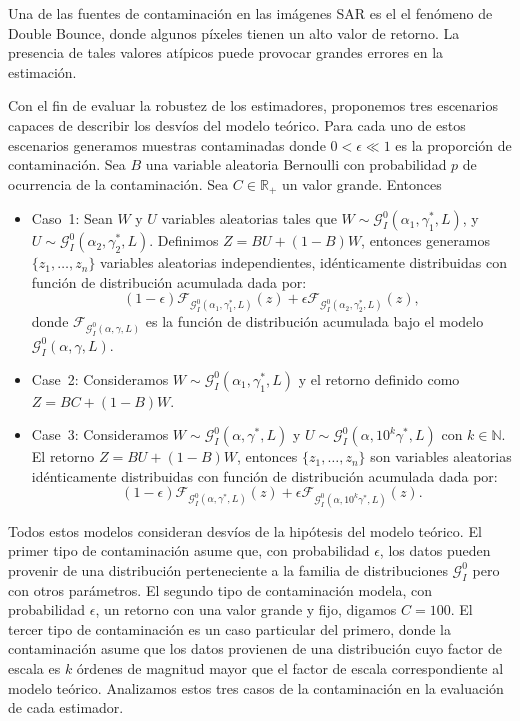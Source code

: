 Una de las fuentes de contaminación en las imágenes SAR es el el fenómeno de Double Bounce, donde algunos píxeles tienen un alto valor de retorno. La presencia de tales valores atípicos puede provocar grandes errores en la estimación.

Con el fin de evaluar la robustez de los estimadores, proponemos tres escenarios capaces de describir los desvíos del modelo teórico. Para cada uno de estos escenarios generamos muestras contaminadas donde $0<\epsilon \ll 1$ es la proporción de contaminación. 
Sea  $B$ una variable aleatoria Bernoulli con probabilidad $p$ de ocurrencia de la contaminación. Sea $C \in \mathbb R_+$ un valor grande. Entonces
\begin{itemize}
	\item Caso~1:
	Sean $W$ y $U$ variables aleatorias tales que $W \sim \mathcal{G}_I^0(\alpha_1,\gamma_1^*,L)$, y $U \sim \mathcal{G}_I^0(\alpha_2,\gamma_2^*,L) $. Definimos $Z=BU+(1-B)W$, entonces generamos $\{z_1,\dots,z_n\}$ variables aleatorias independientes, idénticamente distribuidas con función de distribución acumulada dada por:
	$$
	(1-\epsilon) \mathcal{F}_{\mathcal{G}_I^0(\alpha_1,\gamma_1^*,L)}(z)+\epsilon\mathcal{F}_{\mathcal{G}_I^0(\alpha_2,\gamma_2^*,L)}(z),
	$$
	donde $\mathcal{F}_{\mathcal{G}_I^0(\alpha,\gamma,L)}$ es la función de distribución acumulada bajo el modelo $\mathcal{G}_I^0(\alpha,\gamma,L)$.
	\item Case~2: Consideramos $W \sim \mathcal{G}_I^0(\alpha_1,\gamma_1^*,L)$ y el retorno definido como $Z=BC+(1-B)W$.
	\item Case~3:
	Consideramos $W \sim \mathcal{G}_I^0(\alpha,\gamma^*,L)$ y $U\sim \mathcal{G}_I^0(\alpha,10^k\gamma^*,L) $ con $k \in \mathbb{N}$. 
	El retorno $Z=BU+(1-B)W$, entonces $\{z_1,\dots,z_n\}$ son variables aleatorias idénticamente distribuidas con función de distribución acumulada dada por: 
	$$
	(1-\epsilon) \mathcal{F}_{\mathcal{G}_I^0(\alpha,\gamma^*,L)}(z)+\epsilon\mathcal{F}_{\mathcal{G}_I^0(\alpha,10^k\gamma^*,L)}(z).
	$$
\end{itemize}

Todos estos modelos consideran desvíos de la hipótesis del modelo teórico. El primer tipo de contaminación asume que, con probabilidad $\epsilon$, los datos pueden provenir de una distribución perteneciente a la familia de distribuciones $\mathcal{G}_I^0$ pero con otros parámetros. El segundo tipo de contaminación modela, con probabilidad $\epsilon$, un retorno con una valor grande y fijo, digamos $C=100$. El tercer tipo de contaminación es un caso particular del primero, donde la contaminación asume que los datos provienen de una distribución cuyo factor de escala es $k$ órdenes de magnitud mayor que el factor de escala correspondiente al modelo teórico. Analizamos estos tres casos de la contaminación en la evaluación de cada estimador.

